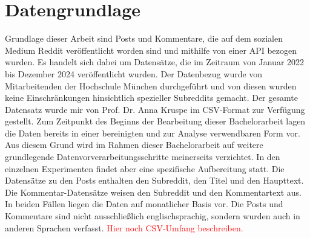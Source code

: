 \section{Datengrundlage}
Grundlage dieser Arbeit sind Posts und Kommentare, die auf dem sozialen Medium Reddit veröffentlicht worden sind und mithilfe von einer API bezogen wurden. Es handelt sich dabei um Datensätze, die im Zeitraum von Januar 2022 bis Dezember 2024 veröffentlicht wurden. Der Datenbezug wurde von Mitarbeitenden der Hochschule München durchgeführt und von diesen wurden keine Einschränkungen hinsichtlich spezieller Subreddits gemacht. Der gesamte Datensatz wurde mir von Prof. Dr. Anna Kruspe im CSV-Format zur Verfügung gestellt. Zum Zeitpunkt des Beginns der Bearbeitung dieser Bachelorarbeit lagen die Daten bereits in einer bereinigten und zur Analyse verwendbaren Form vor. Aus diesem Grund wird im Rahmen dieser Bachelorarbeit auf weitere grundlegende Datenvorverarbeitungsschritte meinerseits verzichtet. In den einzelnen Experimenten findet aber eine spezifische Aufbereitung statt. Die Datensätze zu den Posts enthalten den Subreddit, den Titel und den Haupttext. Die Kommentar-Datensätze weisen den Subreddit und den Kommentartext aus. In beiden Fällen liegen die Daten auf monatlicher Basis vor. Die Posts und Kommentare sind nicht ausschließlich englischsprachig, sondern wurden auch in anderen Sprachen verfasst.
\textcolor{red}{Hier noch CSV-Umfang beschreiben.}

